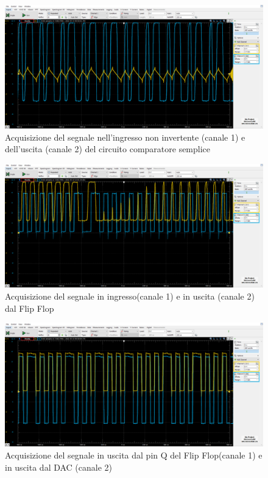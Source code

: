 \documentclass[10pt, a4paper, italian]{article}
\begin{document}
\begin{figure}[htbp]
    \centering
	\includegraphics[width=\textwidth]{MIDDLE.U2.InputVSOutput}
    \caption{Acquisizione del segnale nell'ingresso non invertente (canale 1) e dell'uscita (canale 2) del circuito comparatore semplice}
\end{figure}
\begin{figure}[htbp]
    \centering
	\includegraphics[width=\textwidth]{MIDDLE.U3.InputVSOutput}
    \caption{Acquisizione del segnale in ingresso(canale 1) e in uscita (canale 2) dal Flip Flop}
\end{figure}

\begin{figure}[htbp]
    \centering
	\includegraphics[width=\textwidth]{MIDDLE.U3vU4}
    \caption{Acquisizione del segnale in uscita dal pin Q del Flip Flop(canale 1) e in uscita dal DAC (canale 2)}
\end{figure}
\end{document}
